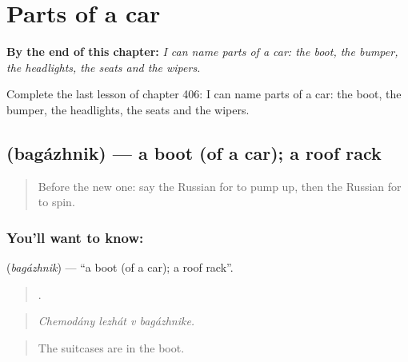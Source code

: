 
\chapter{Parts of a car}
\label{ch:ru-parts-of-a-car}

\begin{chapteropening}
\textbf{By the end of this chapter:} \emph{I can name parts of a car: the boot, the bumper, the headlights, the seats and the wipers.}

Complete the last lesson of chapter 406: I can name parts of a car: the boot, the bumper, the headlights, the seats and the wipers.
\end{chapteropening}

\section[\texorpdfstring{\ru{багажник} (bagázhnik)}{багажник (bagázhnik)}]{ (bagázhnik) — a boot (of a car); a roof rack}

\label{lesson:RU-C406-bagazhnik}



\begin{quote}
Before the new one: say the Russian for to pump up, then the Russian for to spin.
\end{quote}

\subsection*{You'll want to know: }
\textbf{} (\emph{bagázhnik}) — \textquotedblleft{}a boot (of a car); a roof rack\textquotedblright{}.

\begin{quote}
   .
\end{quote}

\begin{quote}
\emph{Chemodány lezhát v bagázhnike.}
\end{quote}

\begin{quote}
The suitcases are in the boot.
\end{quote}

